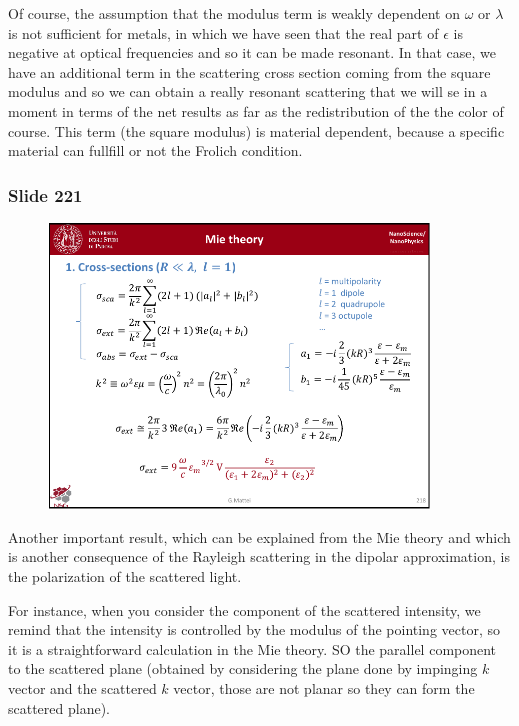 \documentclass[../main/main.tex]{subfiles}
\begin{document}
Of course, the assumption that the modulus term is weakly dependent on $\omega$ or $\lambda$ is not sufficient for metals, in which we have seen that the real part of $\epsilon$ is negative at optical frequencies and so it can be made resonant.
In that case, we have an additional term in the scattering cross section coming from the square modulus and so we can obtain a really resonant scattering that we will se in a moment in terms of the net results as far as the redistribution of the the color of course. This term (the square modulus) is material dependent, because a specific material can fullfill or not the Frolich condition.


\newpage
\subsubsection{Slide 221}

\begin{figure}[h!]
\centering
\includegraphics[page=4,width=0.9\textwidth]{../lessons/pdf_file/14_lesson.pdf}
\end{figure}

Another important result, which can be explained from the Mie theory and which is another consequence of the Rayleigh scattering in the dipolar approximation, is the polarization of the scattered light.

For instance, when you consider the component of the scattered intensity, we remind that the intensity is controlled by the modulus of the pointing vector, so it is a straightforward calculation in the Mie theory. SO the parallel component to the scattered plane (obtained by considering the plane done by impinging \( k \) vector and the scattered \( k \) vector, those are not planar so they can form the scattered plane).
\end{document}
